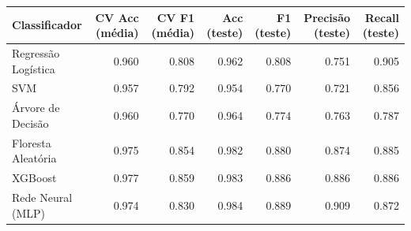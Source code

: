 \begin{tabular}{lrrrrrr}
\toprule
Classificador & CV Acc (média) & CV F1 (média) & Acc (teste) & F1 (teste) & Precisão (teste) & Recall (teste) \\
\midrule
Regressão Logística & 0.960 & 0.808 & 0.962 & 0.808 & 0.751 & 0.905 \\
SVM & 0.957 & 0.792 & 0.954 & 0.770 & 0.721 & 0.856 \\
Árvore de Decisão & 0.960 & 0.770 & 0.964 & 0.774 & 0.763 & 0.787 \\
Floresta Aleatória & 0.975 & 0.854 & 0.982 & 0.880 & 0.874 & 0.885 \\
XGBoost & 0.977 & 0.859 & 0.983 & 0.886 & 0.886 & 0.886 \\
Rede Neural (MLP) & 0.974 & 0.830 & 0.984 & 0.889 & 0.909 & 0.872 \\
\bottomrule
\end{tabular}
